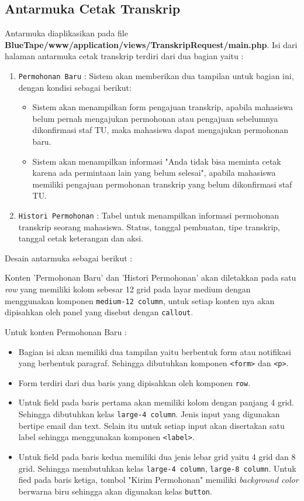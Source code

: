 \subsection{Antarmuka Cetak Transkrip}
Antarmuka diaplikasikan pada file \textbf{BlueTape/www/application/views/TranskripRequest/main.php}. Isi dari halaman antarmuka cetak transkrip terdiri dari dua bagian yaitu :
\begin{enumerate}
	\item \verb|Permohonan Baru| : Sistem akan memberikan dua tampilan untuk bagian ini, dengan kondisi sebagai berikut:
	\begin{itemize}
		\item Sistem akan menampilkan form pengajuan transkrip, apabila mahasiswa belum pernah mengajukan permohonan atau pengajuan sebelumnya  dikonfirmasi staf TU, maka mahasiswa dapat mengajukan permohonan baru.
		\item Sistem akan menampilkan informasi "Anda tidak bisa meminta cetak karena ada permintaan lain yang belum selesai", apabila mahasiswa memiliki pengajuan permohonan transkrip yang belum dikonfirmasi staf TU. 
	\end{itemize}
	\item \verb|Histori Permohonan| : Tabel untuk menampilkan informasi permohonan transkrip seorang mahasiswa. Status, tanggal pembuatan, tipe transkrip, tanggal cetak keterangan dan aksi. 
\end{enumerate}
Desain antarmuka sebagai berikut : \par
Konten 'Permohonan Baru' dan 'Histori Permohonan' akan diletakkan pada satu \textit{row} yang memiliki kolom sebesar 12 grid pada layar medium dengan menggunakan komponen \colorbox{mygray}{\texttt{medium-12 column}}, untuk setiap konten nya akan dipisahkan oleh panel yang disebut dengan \texttt{callout}. \par
Untuk konten Permohonan Baru :
\begin{itemize}
	\item Bagian isi akan memiliki dua tampilan yaitu berbentuk form atau notifikasi yang berbentuk paragraf. Sehingga dibutuhkan komponen \verb|<form>| dan \verb|<p>|.
	\item Form terdiri dari dua baris yang dipisahkan oleh komponen \texttt{row}.
	\item Untuk field pada baris pertama akan memiliki kolom dengan panjang 4 grid. Sehingga dibutuhkan kelas \verb|large-4 column|. Jenis input yang digunakan bertipe email dan text. Selain itu untuk setiap input akan disertakan satu label sehingga menggunakan komponen \texttt{<label>}.
	\item Untuk field pada baris kedua memiliki dua jenis lebar grid yaitu 4 grid dan 8 grid. Sehingga membutuhkan kelas \verb|large-4 column|, \verb|large-8 column|. Untuk fied pada baris ketiga, tombol "Kirim Permohonan" memiliki \textit{background color} berwarna biru sehingga akan digunakan kelas \verb|button|.
\end{itemize}
